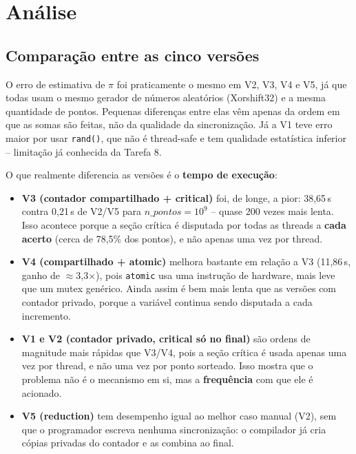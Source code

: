 \documentclass[a4paper,12pt]{article}
\begin{document}
\section{Análise}

\subsection{Comparação entre as cinco versões}

O erro de estimativa de $\pi$ foi praticamente o mesmo em V2, V3, V4
e V5, já que todas usam o mesmo gerador de números aleatórios
(Xorshift32) e a mesma quantidade de pontos. Pequenas diferenças
entre elas vêm apenas da ordem em que as somas são feitas, não da
qualidade da sincronização. Já a V1 teve erro maior por usar
\texttt{rand()}, que não é thread-safe e tem qualidade estatística
inferior -- limitação já conhecida da Tarefa 8.

O que realmente diferencia as versões é o \textbf{tempo de
execução}:

\begin{itemize}
    \item \textbf{V3 (contador compartilhado + critical)} foi, de
    longe, a pior: 38,65\,s contra 0,21\,s de V2/V5 para
    $n\_pontos=10^9$ -- quase 200 vezes mais lenta. Isso acontece
    porque a seção crítica é disputada por todas as threads a
    \textbf{cada acerto} (cerca de 78,5\% dos pontos), e não apenas
    uma vez por thread.

    \item \textbf{V4 (compartilhado + atomic)} melhora bastante em
    relação a V3 (11,86\,s, ganho de $\approx$3,3$\times$), pois
    \texttt{atomic} usa uma instrução de hardware, mais leve que um
    mutex genérico. Ainda assim é bem mais lenta que as versões com
    contador privado, porque a variável continua sendo disputada a
    cada incremento.

    \item \textbf{V1 e V2 (contador privado, critical só no final)}
    são ordens de magnitude mais rápidas que V3/V4, pois a seção
    crítica é usada apenas uma vez por thread, e não uma vez por
    ponto sorteado. Isso mostra que o problema não é o mecanismo em
    si, mas a \textbf{frequência} com que ele é acionado.

    \item \textbf{V5 (reduction)} tem desempenho igual ao melhor caso
    manual (V2), sem que o programador escreva nenhuma sincronização:
    o compilador já cria cópias privadas do contador e as combina ao
    final.
\end{itemize}
\end{document}
